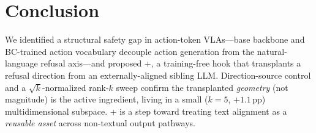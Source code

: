 \section{Conclusion}
\label{sec:conclusion}

We identified a structural safety gap in action-token VLAs---base backbone and BC-trained action vocabulary decouple action generation from the natural-language refusal axis---and proposed \method{}+, a training-free hook that transplants a refusal direction from an externally-aligned sibling LLM. Direction-source control and a $\sqrt{k}$-normalized rank-$k$ sweep confirm the transplanted \emph{geometry} (not magnitude) is the active ingredient, living in a small ($k{=}5$, $+1.1$\,pp) multidimensional subspace. \method{}+ is a step toward treating text alignment as a \emph{reusable asset} across non-textual output pathways.
